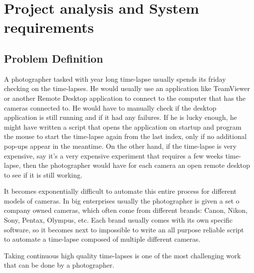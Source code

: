 \section{Project analysis and System requirements}

\subsection{Problem Definition}
A photographer tasked with year long time-lapse usually spends its friday checking on the time-lapses. He would usually use an application like TeamViewer or another Remote Desktop application to connect to the computer that has the cameras connected to. He would have to manually check if the desktop application is still running and if it had any failures. If he is lucky enough, he might have written a script that opens the application on startup and program the mouse to start the time-lapse again from the last index, only if no additional pop-ups appear in the meantime. On the other hand, if the time-lapse is very expensive, say it's a very expensive experiment that requires a few weeks time-lapse, then the photographer would have for each camera an open remote desktop to see if it is still working.

It becomes exponentially difficult to automate this entire process for different models of cameras. In big enterprises usually the photographer is given a set o company owned cameras, which often come from different brands: Canon, Nikon, Sony, Pentax, Olympus, etc. Each brand usually comes with its own specific software, so it becomes next to impossible to write an all purpose reliable script to automate a time-lapse composed of multiple different cameras.

Taking continuous high quality time-lapses is one of the most challenging work that can be done by a photographer.

